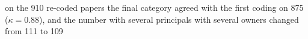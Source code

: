 on the 910 re-coded papers the final category agreed with the first coding on 875 ($\kappa = 0.88$), and the number with several principals with several owners changed from 111 to 109